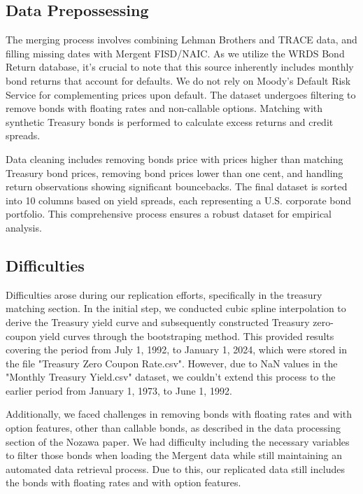 \documentclass{article}
\begin{document}
\subsection{Data Prepossessing}

The merging process involves combining Lehman Brothers and TRACE data, and filling missing dates with Mergent FISD/NAIC. As we utilize the WRDS Bond Return database, it's crucial to note that this source inherently includes monthly bond returns that account for defaults. We do not rely on Moody's Default Risk Service for complementing prices upon default. The dataset undergoes filtering to remove bonds with floating rates and non-callable options. Matching with synthetic Treasury bonds is performed to calculate excess returns and credit spreads. 

Data cleaning includes removing bonds price with prices higher than matching Treasury bond prices, removing bond prices lower than one cent, and handling return observations showing significant bouncebacks. The final dataset is sorted into 10 columns based on yield spreads, each representing a U.S. corporate bond portfolio. This comprehensive process ensures a robust dataset for empirical analysis. 

\subsection{Difficulties}

Difficulties arose during our replication efforts, specifically in the treasury matching section. In the initial step, we conducted cubic spline interpolation to derive the Treasury yield curve and subsequently constructed Treasury zero-coupon yield curves through the bootstraping method. This provided results covering the period from July 1, 1992, to January 1, 2024, which were stored in the file "Treasury Zero Coupon Rate.csv". However, due to NaN values in the "Monthly Treasury Yield.csv" dataset, we couldn't extend this process to the earlier period from January 1, 1973, to June 1, 1992. 

Additionally, we faced challenges in removing bonds with floating rates and with option features, other than callable bonds, as described in the data processing section of the Nozawa paper. We had difficulty including the necessary variables to filter those bonds when loading the Mergent data while still maintaining an automated data retrieval process. Due to this, our replicated data still includes the bonds with floating rates and with option features. 
\end{document}
